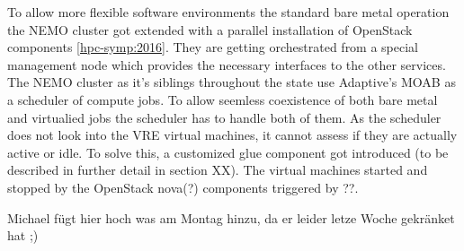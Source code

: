 To allow more flexible software environments the standard bare metal operation
the NEMO cluster got extended with a parallel installation of OpenStack
components \ref{hpc-symp:2016}. They are getting orchestrated from a special
management node which provides the necessary interfaces to the other services.
The NEMO cluster as it's siblings throughout the state use Adaptive's MOAB as a
scheduler of compute jobs. To allow seemless coexistence of both bare metal and
virtualied jobs the scheduler has to handle both of them. As the scheduler does
not look into the VRE virtual machines, it cannot assess if they are actually
active or idle. To solve this, a customized glue component got introduced (to be
described in further detail in section XX). The virtual machines started and
stopped by the OpenStack nova(?) components triggered by ??.

Michael fügt hier hoch was am Montag hinzu, da er leider letze Woche gekränket
hat ;)

